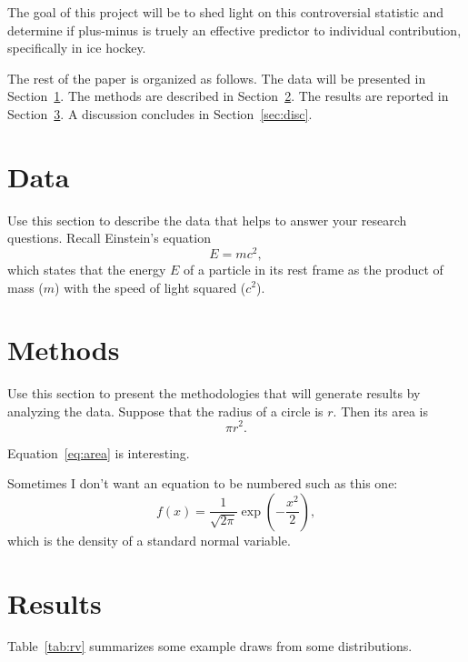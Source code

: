 \documentclass[12pt]{article}
\begin{document}
The goal of this project will be to shed light on this controversial statistic and determine if plus-minus is truely an effective predictor
to individual contribution, specifically in ice hockey. 




The rest of the paper is organized as follows.
The data will be presented in Section~\ref{sec:data}.
The methods are described in Section~\ref{sec:meth}.
The results are reported in Section~\ref{sec:resu}.
A discussion concludes in Section~\ref{sec:disc}.


\section{Data}
\label{sec:data}

Use this section to describe the data that helps to answer your research
questions. Recall Einstein's equation
\begin{equation}
  \label{eq:mc2}
  E = m c^2,
\end{equation}
which states that the energy $E$ of a particle in its rest frame as the product
of mass ($m$) with the speed of light squared ($c^2$).

\section{Methods}
\label{sec:meth}

Use this section to present the methodologies that will generate results by
analyzing the data. Suppose that the radius of a circle is $r$. Then its area is
\begin{equation}
  \label{eq:area}
  \pi r^2.
\end{equation}

Equation~\eqref{eq:area} is interesting. \lipsum[1-4]

Sometimes I don't want an equation to be numbered such as this one:
\[
  f(x) = \frac{1}{\sqrt{2\pi}} \exp\left( - \frac{x^2}{2} \right),
\]
which is the density of a standard normal variable.



\section{Results}
\label{sec:resu}

Table~\ref{tab:rv} summarizes some example draws from some distributions.
\lipsum[1-4]
\end{document}
